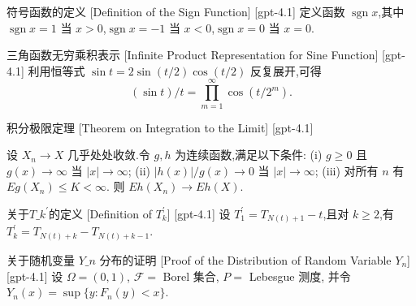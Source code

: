 \documentclass[UTF8]{ctexart}
\begin{document}
    
    
    \begin{dfn}
        {符号函数的定义}
        [Definition of the Sign Function]
        [gpt-4.1]
        定义函数 $\operatorname{sgn} x$,其中 $\operatorname{sgn} x = 1$ 当 $x > 0$,$\operatorname{sgn} x = -1$ 当 $x < 0$,$\operatorname{sgn} x = 0$ 当 $x = 0$.
    \end{dfn}
    
    
    
    \begin{thm}
        {三角函数无穷乘积表示}
        [Infinite Product Representation for Sine Function]
        [gpt-4.1]
        利用恒等式 $\sin t = 2 \sin(t/2) \cos(t/2)$ 反复展开,可得
\[(\sin t)/t = \prod_{m=1}^\infty \cos(t/2^m).\]
    \end{thm}
    
    
    
    \begin{thm}
        {积分极限定理}
        [Theorem on Integration to the Limit]
        [gpt-4.1]
        
设 $X_{n} \to X$ 几乎处处收敛.令 $g, h$ 为连续函数,满足以下条件:
(i) $g \geq 0$ 且 $g(x) \to \infty$ 当 $|x| \to \infty$;
(ii) $|h(x)| / g(x) \to 0$ 当 $|x| \to \infty$;
(iii) 对所有 $n$ 有 $E g(X_{n}) \leq K < \infty$.
则 $E h(X_{n}) \to E h(X)$.

    \end{thm}
    
    
    
    \begin{dfn}
        {关于$T\_{k}^{\prime}$的定义}
        [Definition of $T_{k}^{\prime}$]
        [gpt-4.1]
        设 $T_{1}^{\prime} = T_{N(t)+1} - t$,且对 $k \geq 2$,有 $T_{k}^{\prime} = T_{N(t)+k} - T_{N(t)+k-1}$.
    \end{dfn}
    
    
    
    \begin{prf}
        {关于随机变量 $Y\_n$ 分布的证明}
        [Proof of the Distribution of Random Variable $Y_n$]
        [gpt-4.1]
        设 $\Omega = (0,1)$, ${\mathcal{F}} =$ Borel 集合, $P =$ Lebesgue 测度, 并令 $Y_n(x) = \sup \{ y : F_n(y) < x \}$.
    \end{prf}
    
\end{document}
